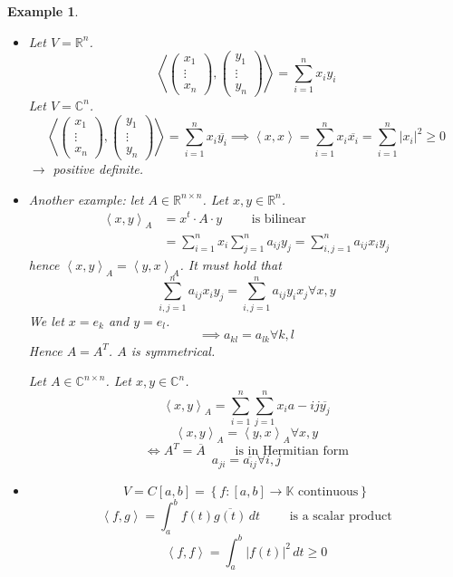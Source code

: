 \documentclass{article}
\newtheorem{example}{Example}  \numberwithin{example}{section}
\newcommand{\set}[1]{\left\{#1\right\}}
\newcommand{\angel}[1]{\left\langle#1\right\rangle}
\newcommand{\card}[1]{\left|#1\right|}
\begin{document}
\begin{example} %
  \begin{itemize}
    \item 
      Let $V = \mathbb R^n$.
      \[
        \angel{\begin{pmatrix} x_1 \\ \vdots \\ x_n \end{pmatrix}, \begin{pmatrix} y_1 \\ \vdots \\ y_n \end{pmatrix}}
        = \sum_{i=1}^n x_i y_i
      \]
      Let $V = \mathbb C^n$.
      \[
        \angel{\begin{pmatrix} x_1 \\ \vdots \\ x_n \end{pmatrix}, \begin{pmatrix} y_1 \\ \vdots \\ y_n \end{pmatrix}}
        = \sum_{i=1}^n x_i \overline{y_i}
        \implies \angel{x, x} = \sum_{i=1}^n x_i \overline{x_i} = \sum_{i=1}^n \card{x_i}^2 \geq 0
      \]
      $\to$ positive definite.

    \item
      Another example: let $A \in \mathbb R^{n \times n}$.
      Let $x, y \in \mathbb R^n$.
      \begin{align*}
        \angel{x, y}_A &= x^t \cdot A \cdot y \qquad \text{ is bilinear} \\
          &= \sum_{i=1}^n x_i \sum_{j=1}^n a_{ij} y_j = \sum_{i,j=1}^n a_{ij} x_i y_j
      \end{align*}
      hence $\angel{x, y}_A = \angel{y, x}_A$.
      It must hold that
      \[ \sum_{i,j=1}^n a_{ij} x_i y_j = \sum_{i,j=1}^n a_{ij} y_i x_j \forall x,y \]
      We let $x = e_k$ and $y = e_l$.
      \[ \implies a_{kl} = a_{lk} \forall k,l \]
      Hence $A = A^T$. $A$ is symmetrical.

      Let $A \in \mathbb C^{n \times n}$. Let $x, y \in \mathbb C^n$.
      \[ \angel{x, y}_A = \sum_{i=1}^n \sum_{j=1}^n x_i a-{ij} \overline{y_j} \]
      \[ \angel{x,y}_A = \angel{y,x}_A \forall x,y \]
      \[ \iff A^T = \overline{A} \qquad \text{ is in Hermitian form} \]
      \[ a_{ji} = \overline{a_{ij}} \forall i ,j \]

    \item
      \[ V = C[a,b] = \set{f: [a,b] \to \mathbb K \text{ continuous}} \]
      \[ \angel{f,g} = \int_a^b f(t) \overline{g(t)} \, dt \qquad \text{ is a scalar product} \]
      \[ \angel{f,f} = \int_a^b \card{f(t)}^2 \, dt \geq 0 \]


\end{itemize}
\end{example}
\end{document}
